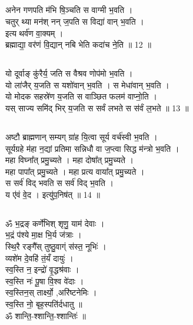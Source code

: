 \subsection{}
अनेन गणपति म॑भि षि॒ञ्चति स वाग्मी भ॒वति ।\\
चतुर् थ्या मन॑श् नन् ज॒पति स विद्या॑ वान् भ॒वति ।\\
इत्य थर्व॑ण वा॒क्यम् । \\
ब्रह्माद्या॒ वर॑णं वि॒द्यान् नबि भेति कदा॑च ने॒ति ॥  12 ॥\\
\subsection{}
यो दूर्वाङ् कु॑रैर्य॒ जति स वैश्रव णोप॑मो भ॒वति ।\\
यो ला॑जैर् य॒जति स यशो॑वान् भ॒वति । स मेधा॑वान् भ॒वति ।\\
यो मोदक सहस्रे॑ण य॒जति स वाञ्छित फलम॑ वाप्नो॒ति ।\\
यस् साज्य समि॑द् भिर् य॒जति स सर्वं लभते स स॑र्वं ल॒भते ॥  13 ॥\\
\subsection{}
अष्टौ ब्राह्मणान् सम्यग् ग्रा॑ह यि॒त्वा सूर्य वर्च॑स्वी भ॒वति ।\\
सूर्यग्रहे म॑हा न॒द्यां प्रतिमा सन्निधौ वा ज॒प्त्वा सिद्ध म॑न्त्रो भ॒वति ।\\
महा विघ्ना᳚त् प्रमु॒च्यते । महा दोषा᳚त् प्रमु॒च्यते ।\\
महा पापा᳚त् प्रमु॒च्यते । महा प्रत्य वाया᳚त् प्रमु॒च्यते ।\\
स सर्व॑ विद् भवति स सर्व॑ विद् भ॒वति ।\\
य ए॑वं वे॒द । {\small इत्यु॑प॒निष॑त्} ॥ 14 ॥\\
\subsection{}
{\small ॐ} भ॒द्रङ् कर्णे॑भिश् शृणु॒ याम॑ देवाः ।\\
भ॒द्रं प॑श्ये मा॒क्ष भि॒र्य ज॑त्राः ।\\
स्थि॒रै रङ्गै᳚स् तुष्ठु॒वाग्ं स॑स्त॒ नूभिः॑ ।\\
व्यशे॑म दे॒वहि॑ तं॒यँ दायुः॑ ।\\
स्व॒स्ति न॒ इन्द्रो॑ वृ॒द्धश्र॑वाः ।\\
स्व॒स्ति नः॑ पू॒षा वि॒श्व वे॑दाः ।\\
स्व॒स्तिन॒स् तार्क्ष्यो॒ ,अरि॑ष्टनेमिः ।\\
स्व॒स्ति नो॒ बृह॒स्पति॑र्दधातु ॥\\
ॐ शान्ति॒-श्शान्ति॒-श्शान्तिः॑ ॥\\
